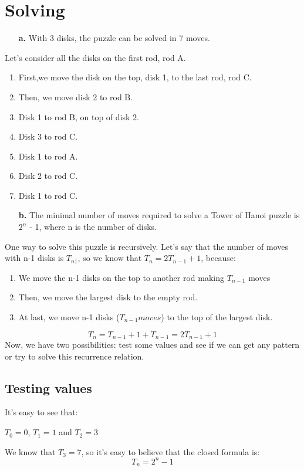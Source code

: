\documentclass{article}
\begin{document}
\section{Solving}
    \begin{itemize}
        \item[\textbf{a.}] With 3 disks, the puzzle can be solved in 7 moves.
        \end{itemize}
        \quad Let's consider all the disks on the first rod, rod A.
        \begin{enumerate}
            \item First,we move the disk on the top, disk 1, to the last rod, rod C.
            \item Then, we move disk 2 to rod B.
            \item Disk 1 to rod B, on top of disk 2.
            \item Disk 3 to rod C.
            \item Disk 1 to rod A.
            \item Disk 2 to rod C.
            \item Disk 1 to rod C.
        \end{enumerate}
        
    \begin{itemize}
        \item[\textbf{b.}] The minimal number of moves required to solve a Tower of Hanoi puzzle is \(2^n\) - 1, where n is the number of disks.
    \end{itemize}
    \quad One way to solve this puzzle is recursively. Let's say that the number of moves with n-1 disks is \(T_{n1}\), so we know that \(T_n = 2T_{n-1} + 1\), because:
    \begin{enumerate}
        \item We move the n-1 disks on the top to another rod making \(T_{n-1}\) moves
        \item Then, we move the largest disk to the empty rod.
        \item At last, we move n-1 disks (\(T_{n-1} moves\)) to the top of the largest disk.
    \end{enumerate}
    \[T_n = T_{n-1} + 1 + T_{n-1} = 2T_{n-1} + 1\]
    Now, we have two possibilities: test some values and see if we can get any pattern or try to solve this recurrence relation.
    \subsection{Testing values}
        It's easy to see that:
        \begin{center}
            \(T_0 = 0\), \(T_1 = 1\) and \(T_2 = 3\)  
        \end{center}
        We know that \(T_3 = 7\), so it's easy to believe that the closed formula is:
        \[T_n = 2^n - 1\]
\end{document}

